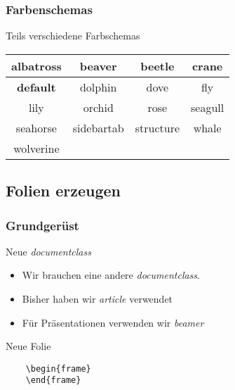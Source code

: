 \begin{frame}
  \frametitle{Farbenschemas}


  \begin{block}{Teils verschiedene Farbschemas}
  \centering
  \begin{tabular}{c|c|c|c}
  albatross & beaver & beetle & crane \\\hline
  \textbf{default} & dolphin & dove & fly \\\hline
  lily & orchid & rose & seagull \\\hline
  seahorse & sidebartab & structure & whale \\\hline
  wolverine & &
  \end{tabular}
  \end{block}
\end{frame}


\subsection{Folien erzeugen}

\begin{frame}[fragile]
  \frametitle{Grundgerüst}
  \begin{block}{Neue \textit{documentclass}}
    \begin{itemize}[<+->]
      \item Wir brauchen eine andere \textit{documentclass}.
      \item Bisher haben wir \textit{article} verwendet
      \item Für Präsentationen verwenden wir \textit{beamer}
    \end{itemize}
  \end{block}
  \pause
  \begin{block}{Neue Folie}
  \begin{verbatim}
    \begin{frame}
    \end{frame}
  \end{verbatim}
  \end{block}
\end{frame}

